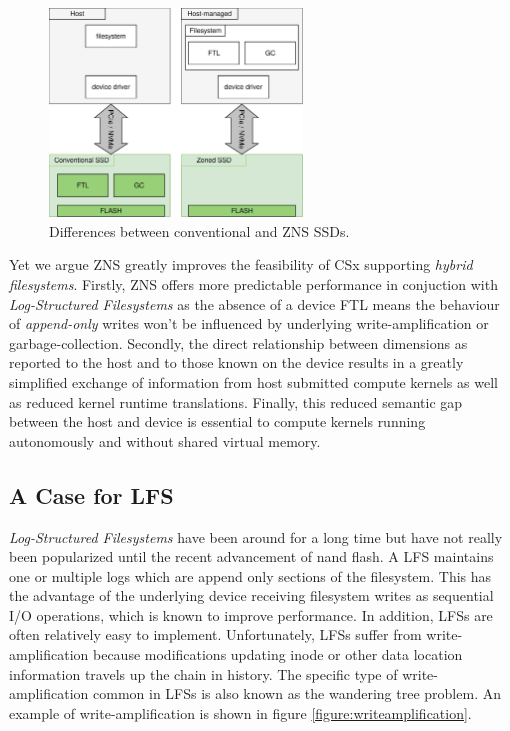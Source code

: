 \begin{figure}
    \centering
	\includegraphics[width=0.6\textwidth]{resources/images/zns-vs-conventional.pdf}
	\caption{Differences between conventional and ZNS SSDs.}
    \label{figure:znsvsconventional}
\end{figure}

Yet we argue ZNS greatly improves the feasibility of CSx supporting
\textit{hybrid filesystems}. Firstly, ZNS offers more predictable performance in
conjuction with \textit{Log-Structured Filesystems} as the absence of a device
FTL means the behaviour of \textit{append-only} writes won't be influenced by
underlying write-amplification or garbage-collection. Secondly, the direct
relationship between dimensions as reported to the host and to those known on
the device results in a greatly simplified exchange of information from host
submitted compute kernels as well as reduced kernel runtime translations.
Finally, this reduced semantic gap between the host and device is essential to
compute kernels running autonomously and without shared virtual memory.

\subsection{A Case for LFS}

\textit{Log-Structured Filesystems} have been around for a long
time \cite{Rosenblum1992TheDA} but have not really been popularized until the
recent advancement of nand flash. A LFS maintains one or multiple logs which
are append only sections of the filesystem. This has the advantage of the
underlying device receiving filesystem writes as sequential I/O operations,
which is known to improve performance. In addition, LFSs are often relatively
easy to implement. Unfortunately, LFSs suffer from write-amplification because
modifications updating inode or other data location information travels up the
chain in history. The specific type of write-amplification common in LFSs is
also known as the wandering tree problem. An example of write-amplification is
shown in figure \ref{figure:writeamplification}.

